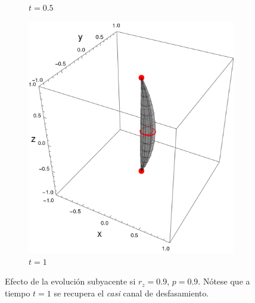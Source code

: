 \begin{figure}[ht!]
\begin{subfigure}{0.32\textwidth}
      \caption{$t=0.5$}
    \end{subfigure}
    \begin{subfigure}{0.32\textwidth}
      \centering
      \includegraphics[width=0.9\linewidth]{chapter3/figures_toy/sphere_CNOT_t=1._r=0.9_p=0.9.png}
      \caption{$t=1$}
    \end{subfigure}
    \caption{Efecto de la evolución subyacente si $r_{z}=0.9$, $p=0.9$. Nótese que a tiempo $t=1$ se recupera el \textit{casi} canal de desfasamiento.  }
    \label{fig:AlmostPhaseFlipSequence}
    \end{figure}

